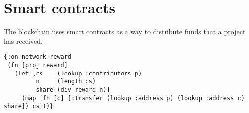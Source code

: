 \section{Smart contracts}

The \oscoin{} blockchain uses smart contracts as a way to distribute funds that
a project has received.

\begin{lstlisting}
{:on-network-reward
 (fn [proj reward]
   (let [cs    (lookup :contributors p)
         n     (length cs)
         share (div reward n)]
     (map (fn [c] [:transfer (lookup :address p) (lookup :address c) share]) cs)))}
\end{lstlisting}
